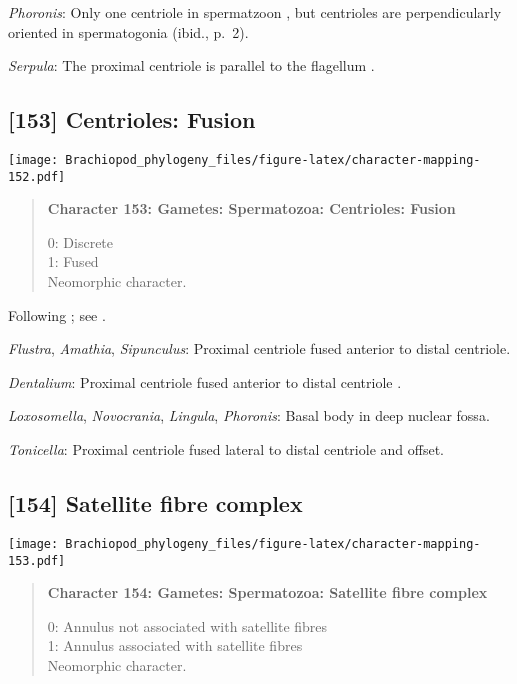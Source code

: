\documentclass[openany]{book}
\theoremstyle{definition}
\theoremstyle{definition}
\theoremstyle{definition}
\theoremstyle{remark}
\begin{document}
\hypertarget{Phoronis-coding-152}{}
\emph{Phoronis}: Only one centriole in spermatzoon
\citep[p.~7]{Reunov2004Ultrastructuralstudy}, but centrioles are
perpendicularly oriented in spermatogonia (ibid., p.~2).

\hypertarget{Serpula-coding-152}{}
\emph{Serpula}: The proximal centriole is parallel to the flagellum
\citep{Gherardi2011}.

\subsection*{{[}153{]} Centrioles: Fusion}\label{centrioles-fusion}

\texttt{[image: Brachiopod\_phylogeny\_files/figure-latex/character-mapping-152.pdf]}

\begin{quote}
\textbf{Character 153: Gametes: Spermatozoa: Centrioles: Fusion}

0: Discrete\\
1: Fused\\
Neomorphic character.
\end{quote}

Following \citet{Smith2012}; see \citet{BucklandNicks2008}.

\hypertarget{Amathia-coding-153}{}
\emph{Flustra}, \emph{Amathia}, \emph{Sipunculus}: Proximal centriole
fused anterior to distal centriole.

\hypertarget{Dentalium-coding-153}{}
\emph{Dentalium}: Proximal centriole fused anterior to distal centriole
\citep{DufresneDube1983}.

\hypertarget{Lingula-coding-153}{}
\emph{Loxosomella}, \emph{Novocrania}, \emph{Lingula}, \emph{Phoronis}:
Basal body in deep nuclear fossa.

\hypertarget{Tonicella-coding-153}{}
\emph{Tonicella}: Proximal centriole fused lateral to distal centriole
and offset.

\subsection*{{[}154{]} Satellite fibre
complex}\label{satellite-fibre-complex}

\texttt{[image: Brachiopod\_phylogeny\_files/figure-latex/character-mapping-153.pdf]}

\begin{quote}
\textbf{Character 154: Gametes: Spermatozoa: Satellite fibre complex}

0: Annulus not associated with satellite fibres\\
1: Annulus associated with satellite fibres\\
Neomorphic character.
\end{quote}
\end{document}
